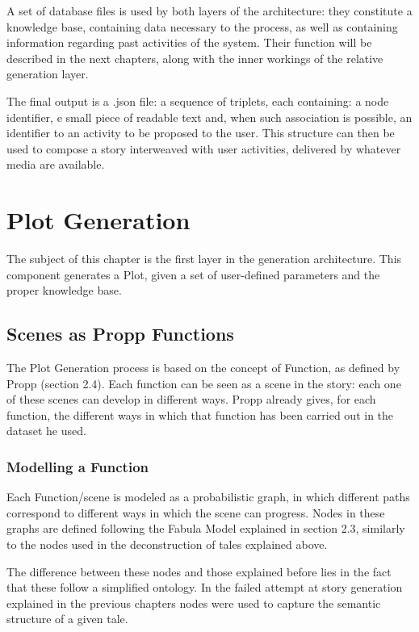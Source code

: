 \documentclass[12pt,a4paper,oneside]{report}
\begin{document}
A set of database files is used by both layers of the architecture: they constitute a knowledge base, containing data necessary to the process, as well as containing information regarding past activities of the system. Their function will be described in the next chapters, along with the inner workings of the relative generation layer.

\bigskip

The final output is a .json file: a sequence of triplets, each containing: a node identifier, e small piece of readable text and, when such association is possible, an identifier to an activity to be proposed to the user. This structure can then be used to compose a story interweaved with user activities, delivered by whatever media are available.

\pagebreak

\chapter{Plot Generation}
The subject of this chapter is the first layer in the generation architecture. This component generates a Plot, given a set of user-defined parameters and the proper knowledge base.

\section{Scenes as Propp Functions}
The Plot Generation process is based on the concept of Function, as defined by Propp (section 2.4). Each function can be seen as a scene in the story: each one of these scenes can develop in different ways. Propp already gives, for each function, the different ways in which that function has been carried out in the dataset he used.

\subsection{Modelling a Function}
Each Function/scene is modeled as a probabilistic graph, in which different paths correspond to different ways in which the scene can progress. Nodes in these graphs are defined following the Fabula Model explained in section 2.3, similarly to the nodes used in the deconstruction of tales explained above.

The difference between these nodes and those explained before lies in the fact that these follow a simplified ontology. In the failed attempt at story generation explained in the previous chapters nodes were used to capture the semantic structure of a given tale. 
\end{document}
